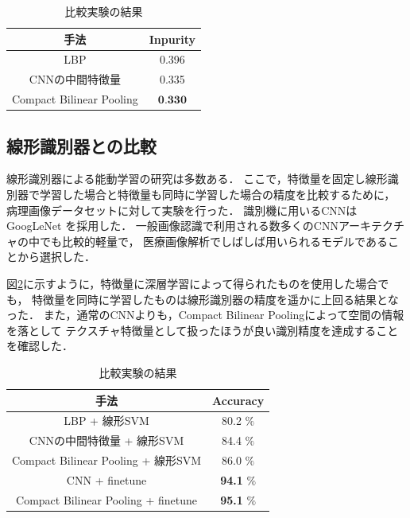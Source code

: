 \begin{table}[h]
  \caption{\label{table:compare_feat}比較実験の結果}
  \center
  \begin{tabular}{c|c} \hline
     手法 & Inpurity \\ \hline
    LBP & 0.396 \\
    CNNの中間特徴量 & 0.335  \\ 
    Compact Bilinear Pooling & $\textbf{0.330}$ \\ \hline
  \end{tabular}
\end{table}

\subsection{線形識別器との比較}
線形識別器による能動学習の研究は多数ある．
ここで，特徴量を固定し線形識別器で学習した場合と特徴量も同時に学習した場合の精度を比較するために，
病理画像データセットに対して実験を行った．
識別機に用いるCNNはGoogLeNet \cite{szegedy2015going}を採用した．
一般画像認識で利用される数多くのCNNアーキテクチャの中でも比較的軽量で，
医療画像解析でしばしば用いられるモデルであることから選択した．

図\ref{table:compare_classifier}に示すように，特徴量に深層学習によって得られたものを使用した場合でも，
特徴量を同時に学習したものは線形識別器の精度を遥かに上回る結果となった．
また，通常のCNNよりも，Compact Bilinear Poolingによって空間の情報を落として
テクスチャ特徴量として扱ったほうが良い識別精度を達成することを確認した．

\begin{table}[h]
  \caption{\label{table:compare_classifier}比較実験の結果}
  \center
  \begin{tabular}{c|c} \hline
    手法 & Accuracy  \\ \hline
    LBP + 線形SVM & 80.2 $\%$ \\
    CNNの中間特徴量 + 線形SVM & 84.4 $\%$  \\ 
    Compact Bilinear Pooling + 線形SVM & 86.0 $\%$ \\ \hline
    CNN + finetune & \textbf{94.1} $\%$  \\ 
    Compact Bilinear Pooling + finetune & \textbf{95.1} $\%$ \\ \hline
  \end{tabular}
\end{table}


